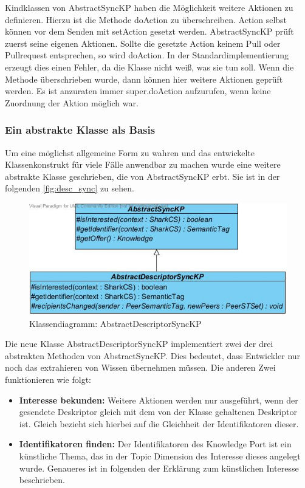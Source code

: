 \documentclass[a4paper]{article}
\begin{document}
	Kindklassen von AbstractSyncKP haben die Möglichkeit weitere Aktionen zu
	definieren. Hierzu ist die Methode doAction zu überschreiben. Action selbst
	können vor dem Senden mit setAction gesetzt werden. AbstractSyncKP prüft
	zuerst seine eigenen Aktionen. Sollte die gesetzte Action keinem Pull
	oder Pullrequest entsprechen, so wird doAction. In der Standardimplementierung
	erzeugt dies einen Fehler, da die Klasse nicht weiß, was sie tun soll.
	Wenn die Methode überschrieben wurde, dann können hier weitere Aktionen
	geprüft werden. Es ist anzuraten immer super.doAction aufzurufen, wenn keine 
	Zuordnung der Aktion möglich war.
		
	\subsubsection{Ein abstrakte Klasse als Basis}
	
	Um eine möglichst allgemeine Form zu wahren und das entwickelte Klassenkonstrukt
	für viele Fälle anwendbar zu machen wurde eine weitere abstrakte Klasse
	geschrieben, die von AbstractSyncKP erbt. Sie ist in der folgenden
	\autoref{fig:desc_sync} zu sehen.
	
	\begin{figure}[H]
		\includegraphics[width=\linewidth]{../Bilder/desc_sync.jpg}
		\caption{Klassendiagramm: AbstractDescriptorSyncKP}
		\label{fig:desc_sync}
	\end{figure}	
	
	Die neue Klasse AbstractDescriptorSyncKP implementiert zwei der drei
	abstrakten Methoden von AbstractSyncKP. Dies bedeutet, dass Entwickler
	nur noch das extrahieren von Wissen übernehmen müssen. Die anderen
	Zwei funktionieren wie folgt:
	
	\begin{itemize}
		\item \textbf{Interesse bekunden:} Weitere Aktionen werden nur ausgeführt,
		wenn der gesendete Deskriptor gleich mit dem von der Klasse gehaltenen
		Deskriptor ist. Gleich bezieht sich hierbei auf die Gleichheit der
		Identifikatoren dieser.
		\item \textbf{Identifikatoren finden:} Der Identifikatoren des Knowledge
		Port ist ein künstliche Thema, das in der Topic Dimension des Interesse
		dieses angelegt wurde. Genaueres ist in folgenden der Erklärung zum 
		künstlichen Interesse beschrieben.
	\end{itemize} 
	
\end{document}

